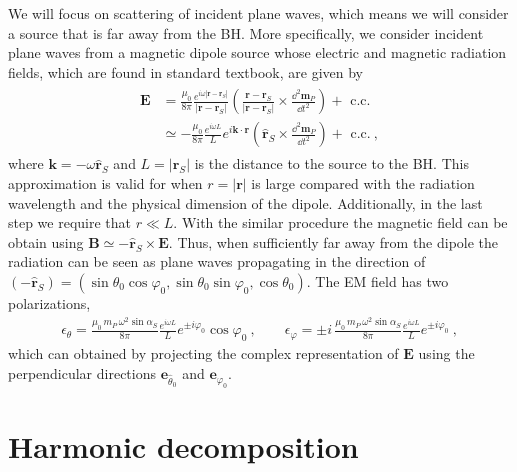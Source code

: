 We will focus on scattering of incident plane waves, which means we will consider a source that is far away from the BH.
More specifically, we consider incident plane waves from a magnetic dipole source whose electric and magnetic radiation fields, which are found in standard textbook, are given by
\begin{align}
    \begin{split}
        \mathbf{E} &= \frac{\mu_0}{8\pi}
        \frac{e^{i\omega|\mathbf{r}-\mathbf{r}_S|}}{|\mathbf{r}-\mathbf{r}_S|} \left(
        \frac{\mathbf{r}-\mathbf{r}_S}{|\mathbf{r}-\mathbf{r}_S|} \times
        \frac{\dd^2 \mathbf{m}_P}{\dd t^2} \right) + \text{ c.c.} \\
        & \simeq  - \frac{\mu_0}{8\pi} \frac{e^{i \omega L}}{L}
        e^{i \mathbf{k} \cdot \mathbf{r}} \left( \mathbf{\hat{r}}_S \times
        \frac{\dd^2 \mathbf{m}_P}{\dd t^2} \right) + \text{ c.c.} ~,
    \end{split}
\end{align}
where $\mathbf{k}= -\omega \mathbf{\hat{r}}_S$ and $L=|\mathbf{r}_S|$ is the distance to the source to the BH.
This approximation is valid for when $r=|\mathbf{r}|$ is large compared with the radiation wavelength and the physical dimension of the dipole.
Additionally, in the last step we require that $r \ll L$.  With the similar procedure the magnetic field can be obtain using $\mathbf{B}\simeq - \mathbf{\hat{r}}_S \times \mathbf{E}$.
Thus, when sufficiently far away from the dipole the radiation can be seen as plane waves propagating in the direction of $(- \mathbf{\hat{r}}_S) = (\sin\theta_0 \cos\varphi_0, \sin\theta_0 \sin\varphi_0, \cos\theta_0)$. The EM field has two polarizations,
\begin{align}
    \epsilon_{\theta} = \frac{\mu_0 \,m_P \,\omega^2 \sin\alpha_S}{8 \pi} \frac{e^{i \omega L}}{L} e^{\pm i \varphi_0} \cos\varphi_0 ~,\qquad
    \epsilon_{\varphi} = \pm i\, \frac{\mu_0 \,m_P \,\omega^2 \sin\alpha_S}{8 \pi} \frac{e^{i \omega L}}{L} e^{\pm i \varphi_0} ~,
\end{align}
which can obtained by projecting the complex representation of $\mathbf{E}$ using the perpendicular directions $\mathbf{e}_{\hat{\theta}_0}$ and $\mathbf{e}_{\hat{\varphi}_0}$.

\section{Harmonic decomposition}

